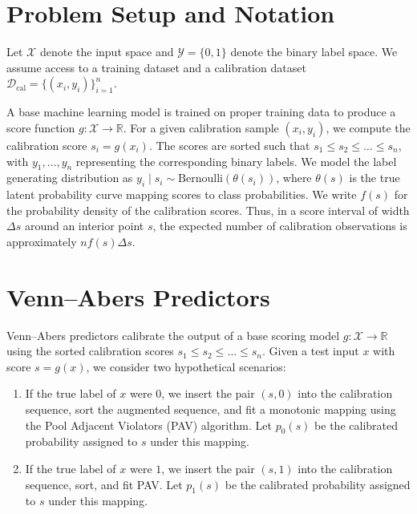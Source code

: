 \documentclass[11pt]{article}
\begin{document}
\section{Problem Setup and Notation}
	\label{sec:setup}
	
	Let $\mathcal{X}$ denote the input space and $\mathcal{Y} = \{0, 1\}$ denote the binary label space. We assume access to a training dataset and a calibration dataset $\mathcal{D}_{\text{cal}} = \{(x_i, y_i)\}_{i=1}^n$. 
	
	A base machine learning model is trained on proper training data to produce a score function $g: \mathcal{X} \to \mathbb{R}$. For a given calibration sample $(x_i, y_i)$, we compute the calibration score $s_i = g(x_i)$. The scores are sorted such that $s_1 \le s_2 \le \dots \le s_n$, with $y_1, \dots, y_n$ representing the corresponding binary labels. We model the label generating distribution as $y_i \mid s_i \sim \text{Bernoulli}(\theta(s_i))$, where $\theta(s)$ is the true latent probability curve mapping scores to class probabilities. We write $f(s)$ for the probability density of the calibration scores. Thus, in a score interval of width $\Delta s$ around an interior point $s$, the expected number of calibration observations is approximately $n f(s)\Delta s$.
	
	\section{Venn--Abers Predictors}
	\label{sec:venn_abers}
	
	Venn--Abers predictors calibrate the output of a base scoring model $g: \mathcal{X} \to \mathbb{R}$ using the sorted calibration scores $s_1 \le s_2 \le \dots \le s_n$. Given a test input $x$ with score $s = g(x)$, we consider two hypothetical scenarios:
	\begin{enumerate}
		\item If the true label of $x$ were $0$, we insert the pair $(s, 0)$ into the calibration sequence, sort the augmented sequence, and fit a monotonic mapping using the Pool Adjacent Violators (PAV) algorithm. Let $p_0(s)$ be the calibrated probability assigned to $s$ under this mapping.
		\item If the true label of $x$ were $1$, we insert the pair $(s, 1)$ into the calibration sequence, sort, and fit PAV. Let $p_1(s)$ be the calibrated probability assigned to $s$ under this mapping.
	\end{enumerate}
	
\end{document}
